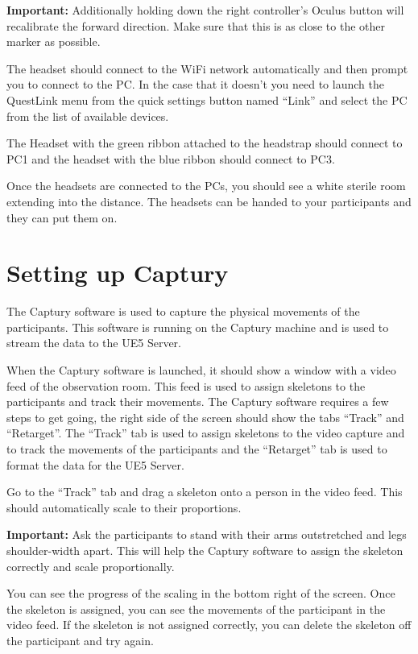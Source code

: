 \begin{tcolorbox}
    \textbf{Important:} Additionally holding down the right controller's Oculus button will recalibrate the forward direction. Make sure that this is as close to the other marker as possible.
\end{tcolorbox}

The headset should connect to the WiFi network automatically and then prompt you to connect to the PC. In the case that it doesn't you need to launch the QuestLink menu from the quick settings button named ``Link'' and select the PC from the list of available devices.

The Headset with the green ribbon attached to the headstrap should connect to PC1 and the headset with the blue ribbon should connect to PC3.

Once the headsets are connected to the PCs, you should see a white sterile room extending into the distance. The headsets can be handed to your participants and they can put them on.

\section{Setting up Captury}
The Captury software is used to capture the physical movements of the participants. This software is running on the Captury machine and is used to stream the data to the UE5 Server.

When the Captury software is launched, it should show a window with a video feed of the observation room. This feed is used to assign skeletons to the participants and track their movements. The Captury software requires a few steps to get going, the right side of the screen should show the tabs ``Track'' and ``Retarget''. The ``Track'' tab is used to assign skeletons to the video capture and to track the movements of the participants and the ``Retarget'' tab is used to format the data for the UE5 Server.

Go to the ``Track'' tab and drag a skeleton onto a person in the video feed. This should automatically scale to their proportions.

\begin{tcolorbox}
    \textbf{Important: } Ask the participants to stand with their arms outstretched and legs shoulder-width apart. This will help the Captury software to assign the skeleton correctly and scale proportionally.
\end{tcolorbox}

You can see the progress of the scaling in the bottom right of the screen. Once the skeleton is assigned, you can see the movements of the participant in the video feed. If the skeleton is not assigned correctly, you can delete the skeleton off the participant and try again.

